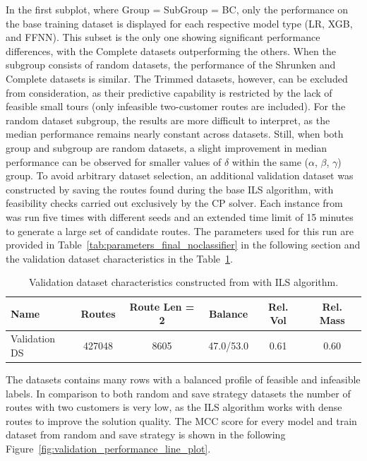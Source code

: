 In the first subplot, where Group = SubGroup = BC, only the performance on the base training dataset is
displayed for each respective model type (\gls{LR}, XGB, and \gls{FFNN}). This subset is the only one showing significant
performance differences, with the Complete datasets outperforming the others. When the subgroup consists of random datasets,
the performance of the Shrunken and Complete datasets is similar. The Trimmed datasets, however, can be excluded from consideration,
as their predictive capability is restricted by the lack of feasible small tours (only infeasible two-customer routes are included).
For the random dataset subgroup, the results are more difficult to interpret, as the median performance remains nearly constant
across datasets. Still, when both group and subgroup are random datasets, a slight improvement in median performance can
be observed for smaller values of $\delta$ within the same ($\alpha$, $\beta$, $\gamma$) group. To avoid arbitrary dataset
selection, an additional validation dataset was constructed by saving the routes found during the base \gls{ILS} algorithm,
with feasibility checks carried out exclusively by the \gls{CP} solver. Each instance from \gendreauDataSetText was run
five times with different seeds and an extended time limit of 15 minutes to generate a large set of candidate routes.
The parameters used for this run are provided in Table~\ref{tab:parameters_final_noclassifier} in the following section and
the validation dataset characteristics in the Table~\ref{tab:validation_dataset_gendreau}.
\begin{table}[!ht]
    \centering
    \small
    \begin{tabular}{l c c c c c }
        \toprule
        Name          & Routes & Route Len = 2 & Balance   & Rel. Vol & Rel. Mass \\
        \midrule
        Validation DS & 427048 & 8605          & 47.0/53.0 & 0.61     & 0.60      \\
        \bottomrule
    \end{tabular}
    \caption{Validation dataset characteristics constructed from \gendreauDataSetText with ILS algorithm.}
    \label{tab:validation_dataset_gendreau}
\end{table}

The datasets contains many rows with a balanced profile of feasible and infeasible labels. In comparison to both
random and save strategy datasets the number of routes with two customers is very low, as the \gls{ILS} algorithm
works with dense routes to improve the solution quality. The \gls{MCC} score for every model and train dataset
from random and save strategy is shown in the following Figure~\ref{fig:validation_performance_line_plot}.

